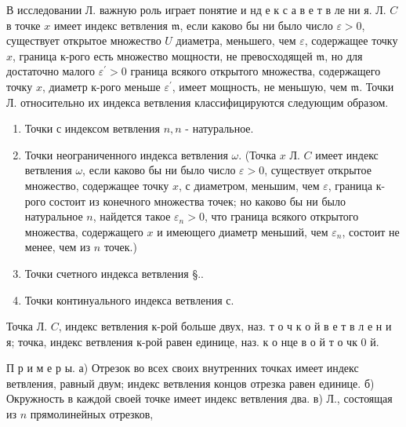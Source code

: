 \documentclass[10pt]{article}
\begin{document}
В исследовании Л. важную роль играет понятие и нд е к с а в е т в ле ни я. Л. $C$ в точке $x$ имеет индекс ветвления $\mathfrak{m}$, если каково бы ни было число $\varepsilon>0$, существует открытое множество $U$ диаметра, меньшего, чем $\varepsilon$, содержащее точку $x$, граница к-рого есть множество мощности, не превосходящей $\mathfrak{m}$, но для достаточно малого $\varepsilon^{\prime}>0$ граница всякого открытого множества, содержащего точку $x$, диаметр к-рого меньше $\varepsilon^{\prime}$, имеет мощность, не меньшую, чем $\mathfrak{m}$. Точки Л. относительно их индекса ветвления классифицируются следующим образом.



\begin{enumerate}

  \item Точки с индексом ветвления $n, n$ - натуральное.



  \item Точки неограниченного индекса ветвления $\omega$. (Точка $x$ Л. $C$ имеет индекс ветвления $\omega$, если каково бы ни было число $\varepsilon>0$, существует открытое множество, содержащее точку $x$, с диаметром, меньшим, чем $\varepsilon$, граница к-рого состоит из конечного множества точек; но каково бы ни было натуральное $n$, найдется такое $\varepsilon_{n}>0$, что граница всякого открытого множества, содержащего $x$ и имеющего диаметр меньший, чем $\varepsilon_{n}$, состоит не менее, чем из $n$ точек.)



  \item Точки счетного индекса ветвления §..



  \item Точки континуального индекса ветвления с.



\end{enumerate}



Точка Л. $C$, индекс ветвления к-рой больше двух, наз. т о ч к о й в е т в л е н и я; точка, индекс ветвления к-рой равен единице, наз. к о нце в о й т о чк 0 й.



П р и м е р ы. а) Отрезок во всех своих внутренних точках имеет индекс ветвления, равный двум; индекс ветвления концов отрезка равен единице. б) Окружность в каждой своей точке имеет индекс ветвления два. в) Л., состоящая из $n$ прямолинейных отрезков,
\end{document}
